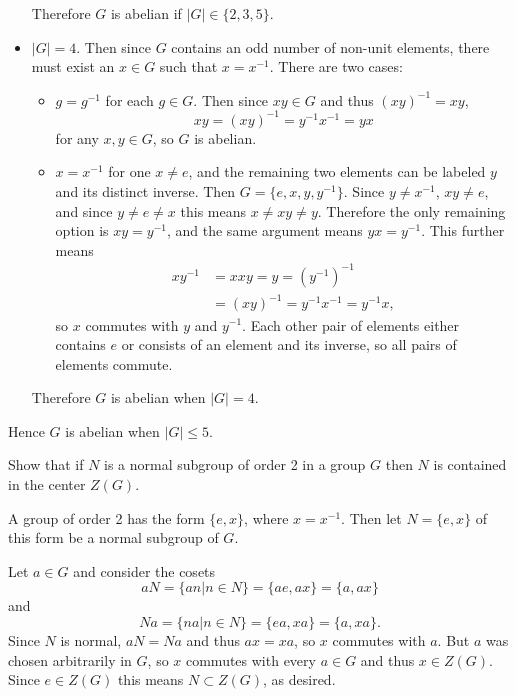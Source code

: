 \documentclass{article}
\newcounter{Problem}
\newenvironment{Problem}{\begin{Exercise}[name={Problem},
                                          counter={Problem}]}
                        {\end{Exercise}}
\begin{document}
\begin{Answer}
\begin{itemize}
{        Therefore $G$ is abelian if $|G| \in \{2, 3, 5\}$.
      }
  \item{$|G| = 4$. Then since $G$ contains an odd number of non-unit
      elements, there must exist an $x \in G$ such that $x = x^{-1}$.
      There are two cases:
      \begin{itemize}
        \item{$g = g^{-1}$ for each $g \in G$. Then since $xy \in G$
              and thus $(xy)^{-1} = xy$,
              $$
              xy = (xy)^{-1} = y^{-1} x^{-1} = yx
              $$
              for any $x, y \in G$, so $G$ is abelian.
              }
        \item{$x = x^{-1}$ for one $x \neq e$, and the remaining two
              elements can be labeled $y$ and its distinct inverse.
              Then $G = \{e, x, y, y^{-1}\}$. Since $y \neq x^{-1}$,
              $xy \neq e$, and since $y \neq e \neq x$ this means
              $x \neq xy \neq y$. Therefore the only remaining option
              is $xy = y^{-1}$, and the same argument means
              $yx = y^{-1}$. This further means
              \begin{align*}
              x y^{-1} &= xxy = y = (y^{-1})^{-1} \\
                      &= (xy)^{-1} = y^{-1} x^{-1} = y^{-1} x,
              \end{align*}
              so $x$ commutes with $y$ and $y^{-1}$. Each other pair
              of elements either contains $e$ or consists of an
              element and its inverse, so all pairs of elements commute.
             }
      \end{itemize}
       Therefore $G$ is abelian when $|G| = 4$.
       }
\end{itemize}
Hence $G$ is abelian when $|G| \leq 5$.
\end{Answer}

\pagebreak

\begin{Problem}
Show that if $N$ is a normal subgroup of order 2 in a group $G$ then
$N$ is contained in the center $Z(G)$.
\end{Problem}

\begin{Answer}
A group of order 2 has the form $\{ e, x \}$, where $x =
x^{-1}$. Then let $N = \{ e, x \}$ of this form be a normal subgroup
of $G$.

Let $a \in G$ and consider the cosets
$$aN = \{ an | n \in N \} = \{ ae, ax \} = \{ a, ax \}$$
and
$$Na = \{ na | n \in N \} = \{ ea, xa \} = \{ a, xa \}.$$
Since $N$ is normal, $aN = Na$ and thus $ax = xa$, so $x$
commutes with $a$. But $a$ was chosen arbitrarily in $G$, so $x$ commutes
with every $a \in G$ and thus $x \in Z(G)$. Since $e \in Z(G)$ this
means $N \subset Z(G)$, as desired.
\end{Answer}
\end{document}
